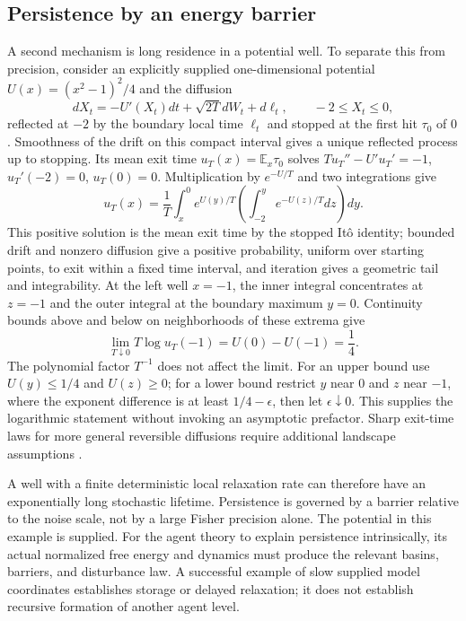 \subsection{Persistence by an energy barrier}
\label{sec:persistence_metastability}

A second mechanism is long residence in a potential well. To separate this from precision, consider an explicitly supplied one-dimensional potential
$U(x)=(x^2-1)^2/4$ and the diffusion
\begin{equation}
 dX_t=-U'(X_t)dt+\sqrt{2T}dW_t+d\ell_t,
 \qquad -2\le X_t\le0,
\end{equation}
reflected at $-2$ by the boundary local time $\ell_t$ and stopped at the first hit $\tau_0$ of $0$. Smoothness of the drift on this compact interval gives a unique reflected process up to stopping. Its mean exit time $u_T(x)=\mathbb E_x\tau_0$ solves
$Tu_T''-U'u_T'=-1$, $u_T'(-2)=0$, $u_T(0)=0$. Multiplication by $e^{-U/T}$ and two integrations give
\begin{equation}
 u_T(x)=\frac1T\int_x^0e^{U(y)/T}
 \left(\int_{-2}^{y}e^{-U(z)/T}dz\right)dy.
 \label{eq:persistence_exit_time}
\end{equation}
This positive solution is the mean exit time by the stopped It\^o identity; bounded drift and nonzero diffusion give a positive probability, uniform over starting points, to exit within a fixed time interval, and iteration gives a geometric tail and integrability. At the left well $x=-1$, the inner integral concentrates at $z=-1$ and the outer integral at the boundary maximum $y=0$. Continuity bounds above and below on neighborhoods of these extrema give
\begin{equation}
 \lim_{T\downarrow0}T\log u_T(-1)=U(0)-U(-1)=\frac14.
 \label{eq:persistence_arrhenius}
\end{equation}
The polynomial factor $T^{-1}$ does not affect the limit. For an upper bound use $U(y)\le1/4$ and $U(z)\ge0$; for a lower bound restrict $y$ near $0$ and $z$ near $-1$, where the exponent difference is at least $1/4-\epsilon$, then let $\epsilon\downarrow0$. This supplies the logarithmic statement without invoking an asymptotic prefactor. Sharp exit-time laws for more general reversible diffusions require additional landscape assumptions \cite{BovierEtAl2004Metastability}.

A well with a finite deterministic local relaxation rate can therefore have an exponentially long stochastic lifetime. Persistence is governed by a barrier relative to the noise scale, not by a large Fisher precision alone. The potential in this example is supplied. For the agent theory to explain persistence intrinsically, its actual normalized free energy and dynamics must produce the relevant basins, barriers, and disturbance law. A successful example of slow supplied model coordinates establishes storage or delayed relaxation; it does not establish recursive formation of another agent level.

